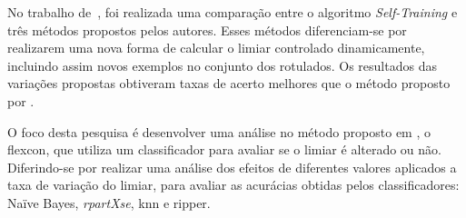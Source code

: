     No trabalho de~, foi realizada uma comparação entre o algoritmo \textit{Self\hyp{Training}} e três métodos propostos pelos autores. Esses métodos diferenciam\hyp{se} por realizarem uma nova forma de calcular o limiar controlado dinamicamente, incluindo assim novos exemplos no conjunto dos rotulados. Os resultados das variações propostas obtiveram taxas de acerto melhores que o método proposto por .
    
    
    
    O foco desta pesquisa é desenvolver uma análise no método proposto em , o \ac{flexcon}, que utiliza um classificador para avaliar se o limiar é alterado ou não. Diferindo\hyp{se} por realizar uma análise dos efeitos de diferentes valores aplicados a taxa de variação do limiar, para avaliar as acurácias obtidas pelos classificadores: Na\"ive Bayes, \textit{rpartXse}, \ac{knn} e \ac{ripper}.